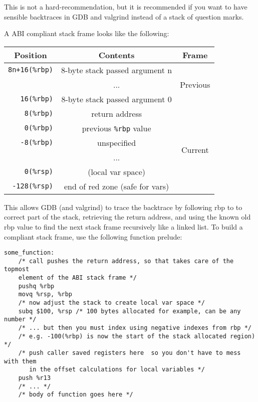 \documentclass[11pt]{article}
\begin{document}
This is not a hard-recommendation, but it is recommended if you want to have sensible
backtraces in GDB  and valgrind instead of a stack of question marks.

A ABI compliant stack frame looks like the following:

\begin{tabular}{r | c | c}
    \multicolumn{1}{c}{Position} & \multicolumn{1}{c}{Contents} & \multicolumn{1}{c}{Frame}\\\hline
    \texttt{8n+16(\%rbp)} & 8-byte stack passed argument n  & \multirow{3}{*}{Previous} \\
                          & ...                             & \\
       \texttt{16(\%rbp)} & 8-byte stack passed argument 0  & \\\hline
        \texttt{8(\%rbp)} & return address                  & \multirow{6}{*}{Current} \\\cline{2-2}
        \texttt{0(\%rbp)} & previous \texttt{\%rbp} value   & \\\cline{2-2}
       \texttt{-8(\%rbp)} & unspecified                     & \\
                          & ...                             & \\
        \texttt{0(\%rsp)} & (local var space)               & \\\cline{2-2}
     \texttt{-128(\%rsp)} & end of red zone (safe for vars) &

\end{tabular}

This allows GDB (and valgrind) to trace the backtrace by following rbp to to correct part
of the stack, retrieving the return address, and using the known old rbp value to find the
next stack frame recursively like a linked list. To build a compliant stack frame, use the
following function prelude:

\begin{lstlisting}
some_function:
    /* call pushes the return address, so that takes care of the topmost
    element of the ABI stack frame */
    pushq %rbp
    movq %rsp, %rbp
    /* now adjust the stack to create local var space */
    subq $100, %rsp /* 100 bytes allocated for example, can be any number */
    /* ... but then you must index using negative indexes from rbp */
    /* e.g. -100(%rbp) is now the start of the stack allocated region) */
    /* push caller saved registers here  so you don't have to mess with them
       in the offset calculations for local variables */
    push %r13
    /* ... */
    /* body of function goes here */
\end{lstlisting}
\end{document}

